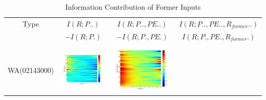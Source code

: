 \documentclass[11pt]{article}
\begin{document}
\begin{table}[H]\small
\caption{Information Contribution of Former Inputs}
\label{former}
\resizebox{\textwidth}{!}
{
\centering
\begin{tabular}{cccc}
\toprule
Type&$I(R;P..)$&$I(R;P..,PE..) $&$I(R;P..,PE..,R_{former}..)$\\
 &$ -I(R;P.)$ &$ -I(R;P.,PE.)$&$I(R;P.,PE.,R_{former}.)$\\\hline
\\
WA(02143000)
&\begin{minipage}{.3\textwidth}\includegraphics[width=\linewidth]{resultgraph/02143000pdiff_former.png}\end{minipage}
&\begin{minipage}{.3\textwidth}\includegraphics[width=\linewidth]{resultgraph/02143000epdiff_former.png}\end{minipage}

\end{tabular}}
\end{table}
\end{document}
